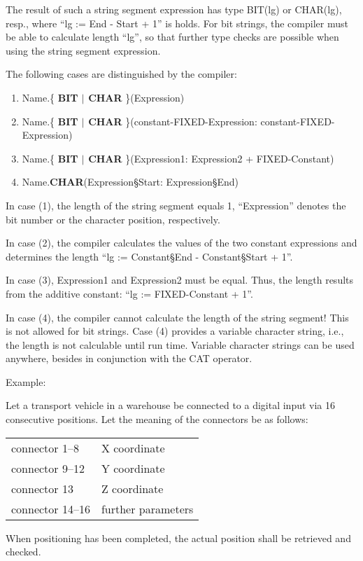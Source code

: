 The result of such a string segment expression has type BIT(lg) or
CHAR(lg), resp., where ``lg := End - Start + 1'' is holds. For bit
strings, the compiler must be able to calculate length ``lg'', so that
further type checks are possible when using the string segment
expression.

The following cases are distinguished by the compiler:
\begin{enumerate}
\item Name.\{ {\bf BIT $\mid$ CHAR} \}(Expression)
\item Name.\{ {\bf BIT $\mid$ CHAR} \}(constant-FIXED-Expression: constant-FIXED-Expression)
\item Name.\{ {\bf BIT $\mid$ CHAR} \}(Expression1: Expression2 + FIXED-Constant)
\item Name.{\bf CHAR}(Expression\S Start: Expression\S End)
\end{enumerate}

In case (1), the length of the string segment equals 1, ``Expression''
denotes the bit number or the character position, respectively.

In case (2), the compiler calculates the values of the two constant
expressions and determines the length ``lg := Constant\S End -
Constant\S Start + 1''.

In case (3), Expression1 and Expression2 must be equal. Thus, the length
results from the additive constant: ``lg := FIXED-Constant + 1''.

In case (4), the compiler cannot calculate the length of the string
segment! This is not allowed for bit strings. Case (4) provides a
variable character string, i.e., the length is not calculable until run
time. Variable character strings can be used anywhere, besides in
conjunction with the CAT operator.

Example:

Let a transport vehicle in a warehouse be connected to a digital input
via 16 consecutive positions. Let the meaning of the connectors be as
follows:

\begin{tabular}{l@{ : }l}
connector 1--8   & X coordinate\\
connector 9--12  & Y coordinate\\
connector 13     & Z coordinate\\
connector 14--16 & further parameters
\end{tabular}

When positioning has been completed, the actual position shall be
retrieved and checked.

